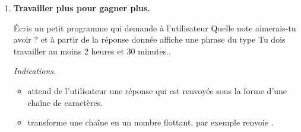 \documentclass[11pt,class=report,crop=false]{standalone}
\begin{document}
\begin{activite}
\begin{enumerate}
	
	\item \textbf{Travailler plus pour gagner plus.}
	
	\'Ecris un petit programme qui demande à l'utilisateur \og{}Quelle note aimerais-tu avoir ?\fg{}
	et à partir de la réponse donnée affiche une phrase du type \og{}Tu dois travailler au moins 2 heures et 30 minutes.\fg{}. 
	
	\emph{Indications.} 
	\begin{itemize}
		\item {} attend de l'utilisateur une réponse qui est renvoyée sous la forme d'une chaîne de caractères. 
		\item {} transforme une chaîne en un nombre flottant, par exemple 
		 renvoie .
	\end{itemize}
\end{enumerate}
	
\end{activite}




\end{document}
